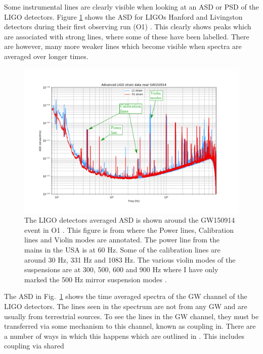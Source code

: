 Some instrumental lines are clearly visible when looking at an \gls{ASD} or
\gls{PSD} of the \gls{LIGO} detectors. Figure \ref{detchar:line:psd} shows the
\gls{ASD} for \glspl{LIGO} Hanford and Livingston detectors during their first
observing run (O1) \citep{GWOpen}. This clearly shows peaks which are
associated with strong lines, where some of these have been labelled. There are however, many
more weaker lines which become visible when spectra are averaged over longer
times.
%
\begin{figure} \centering
\includegraphics[width=\textwidth]{C6_detchar/ligo_o1_asd_annot.pdf}
\caption[Strain \gls{ASD} for the \gls{LIGO} detectors.]{
	The \gls{LIGO} detectors averaged \gls{ASD} is shown around the GW150914 event in O1 \citep{abbott2016ObservationGravitational}.
	This figure is from \citep{GWOpen} where the Power lines, Calibration lines and Violin modes are annotated. The
	power line from the mains in the USA is at 60 Hz. Some of the calibration lines
	are around 30 Hz, 331 Hz and 1083 Hz. The various violin modes of the suspensions are at 300, 500, 600 and 900 Hz where I have only marked the 500 Hz mirror suspension modes \citep{GWOpen}.} 
	\label{detchar:line:psd} 
\end{figure}
%
The \gls{ASD} in Fig.~\ref{detchar:line:psd} shows the time averaged spectra
of the \gls{GW} channel of the \gls{LIGO} detectors. The lines seen in the spectrum are not from any \gls{GW}
and are usually from terrestrial sources.  To see the lines in the \gls{GW}
channel, they must be transferred via some mechanism to this channel, known as coupling in.  There are a number of
ways in which this happens which are outlined in
\citep{covas2018IdentificationMitigation}.  This includes coupling via shared
